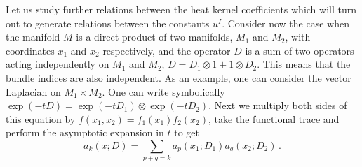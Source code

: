 Let us study further relations between the heat kernel coefficients
which will turn out to generate relations between the constants $u^I$.
Consider now the case when the manifold $M$ is a direct product
of two manifolds, $M_1$ and $M_2$, with coordinates $x_1$ and
$x_2$ respectively,
and the operator $D$ is a 
sum of two operators acting independently on $M_1$ and $M_2$,
$D=D_1\otimes 1 +1\otimes D_2$. This means that the bundle indices
are also independent. As an example, one can consider the vector Laplacian
on $M_1\times M_2$.  One can write symbolically
$\exp (-tD)=\exp (-tD_1)\otimes \exp (-tD_2)$. Next we multiply
both sides of this equation by $f(x_1,x_2)=f_1(x_1)f_2(x_2)$, take
the functional trace and perform the asymptotic expansion in $t$
to get
\begin{equation}
a_k(x;D)=\sum_{p+q=k} a_p(x_1;D_1)a_q(x_2;D_2)\,.
\label{product}
\end{equation}

